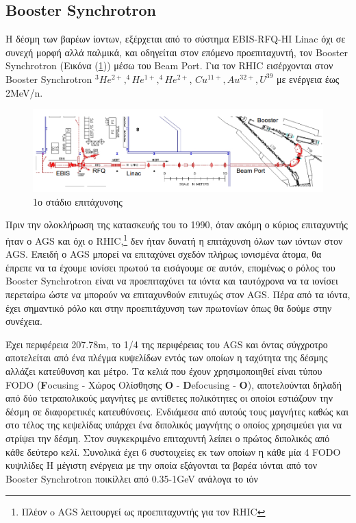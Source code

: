 \subsection{Booster Synchrotron}

Η δέσμη των βαρέων ίοντων, εξέρχεται από το σύστημα EBIS-RFQ-HI Linac όχι σε συνεχή μορφή αλλά παλμικά, και οδηγείται στον επόμενο προεπιταχυντή, τον Booster Synchrotron (Εικόνα (\ref{fig2.5})) μέσω του Beam Port. Για τον RHIC εισέρχονται στον Booster Synchrotron $^3He^{2+}, ^4He^{1+}, ^4He^{2+}$, $ Cu^{11+}, Au^{32+}, U^{39}$ με ενέργεια έως 2MeV/n. 

	\begin{figure}[h!]
		\centering
		\includegraphics[scale=0.5]{Accelerating_System/1st_stage.png}
		\caption{1ο στάδιο επιτάχυνσης}
		\label{fig2.5}
	\end{figure}
	
	Πριν την ολοκλήρωση της κατασκευής του το 1990, όταν ακόμη ο κύριος επιταχυντής ήταν ο AGS και όχι ο RHIC,\footnote{Πλέον o AGS λειτουργεί ως προεπιταχυντής για τον RHIC} δεν ήταν δυνατή η επιτάχυνση όλων των ιόντων στον AGS. 
	Επειδή ο AGS μπορεί να επιταχύνει σχεδόν πλήρως ιονισμένα άτομα, θα έπρεπε να τα έχουμε ιονίσει πρωτού τα εισάγουμε σε αυτόν, επομένως
	ο ρόλος του Booster Synchrotron είναι να προεπιταχύνει τα ιόντα και ταυτόχρονα να τα ιονίσει περεταίρω ώστε να μπορούν να επιταχυνθούν επιτυχώς στον AGS. Πέρα από τα ιόντα, έχει σημαντικό ρόλο και στην προεπιτάχυνση των πρωτονίων όπως θα δούμε στην συνέχεια.
	
	Έχει περιφέρεια 207.78m, το 1/4 της περιφέρειας του AGS και όντας σύγχροτρο αποτελείται από ένα πλέγμα κυψελίδων εντός των οποίων η ταχύτητα της δέσμης αλλάζει κατεύθυνση και μέτρο.
	 Τα κελιά που έχουν χρησιμοποιηθεί είναι τύπου FODO (\textbf{F}ocusing - Χώρος Ολίσθησης \textbf{O} - \textbf{D}efocusing - \textbf{O}), αποτελούνται δηλαδή από δύο τετραπολικούς μαγνήτες με αντίθετες πολικότητες οι οποίοι εστιάζουν την δέσμη σε διαφορετικές κατευθύνσεις. Ενδιάμεσα από αυτούς τους μαγνήτες καθώς και στο τέλος της κεψελίδας υπάρχει ένα διπολικός μαγνήτης ο οποίος χρησιμεύει για να στρίψει την δέσμη. Στον συγκεκριμένο επιταχυντή λείπει ο πρώτος διπολικός από κάθε δεύτερο κελί.
	 Συνολικά έχει 6 συστοιχείες εκ των οποίων η κάθε μία 4 FODO κυψιλίδες 
	Η μέγιστη ενέργεια με την οποία εξάγονται τα βαρέα ιόνται από τον Booster Synchrotron ποικίλλει από 0.35-1GeV ανάλογα το ιόν